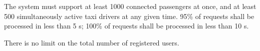 The system must support at least 1000 connected passengers at once, and at least 500 simultaneously active taxi drivers at any given time.
95\% of requests shall be processed in less than 5 s; 100\% of requests shall be processed in less than 10 s.

There is no limit on the total number of registered users.